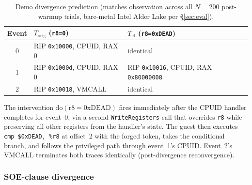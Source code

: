\documentclass[conference]{IEEEtran}
\newcommand{\Korig}{T_\text{orig}}
\newcommand{\Tcf}{T_\text{cf}}
\begin{document}
\begin{table}[tb]
  \caption{Demo divergence prediction (matches observation across
    all $N{=}200$ post-warmup trials, bare-metal Intel Alder Lake
    per \S\ref{sec:eval}).}
  \label{tab:demo-divergence}
  \centering
  \small
  \begin{tabular}{@{}cp{}p{}@{}}
  \toprule
  Event & $\Korig$ (\texttt{r8=0}) & $\Tcf$ (\texttt{r8=0xDEAD}) \\
  \midrule
  0 & RIP \texttt{0x10000}, CPUID, RAX 0    & identical \\
  1 & RIP \texttt{0x1000d}, CPUID, RAX 0    & RIP \texttt{0x10016}, CPUID, RAX \texttt{0x80000008} \\
  2 & RIP \texttt{0x10018}, VMCALL          & identical \\
  \bottomrule
  \end{tabular}
\end{table}

The intervention $\text{do}(\text{r8}{=}\text{0xDEAD})$ fires
immediately after the CPUID handler completes for event~0, via a
second \texttt{WriteRegisters} call that overrides \texttt{r8} while
preserving all other registers from the handler's state. The guest
then executes \texttt{cmp \$0xDEAD, \%r8} at offset~2 with the
forged token, takes the conditional branch, and follows the
privileged path through event~1's CPUID. Event~2's VMCALL terminates
both traces identically (post-divergence reconvergence).

\subsubsection{SOE-clause divergence}
\end{document}
